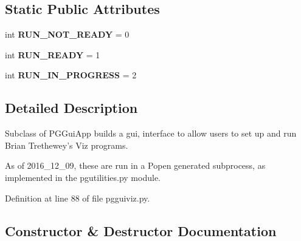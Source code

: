\subsection*{Static Public Attributes}
\begin{DoxyCompactItemize}
\item 
int {\bfseries R\+U\+N\+\_\+\+N\+O\+T\+\_\+\+R\+E\+A\+DY} = 0\hypertarget{classnegui_1_1pgguiviz_1_1PGGuiViz_a1199bb647ec58223ccbbeee7882e59dc}{}\label{classnegui_1_1pgguiviz_1_1PGGuiViz_a1199bb647ec58223ccbbeee7882e59dc}

\item 
int {\bfseries R\+U\+N\+\_\+\+R\+E\+A\+DY} = 1\hypertarget{classnegui_1_1pgguiviz_1_1PGGuiViz_a61b766c446b022b66ac5190a970a39ef}{}\label{classnegui_1_1pgguiviz_1_1PGGuiViz_a61b766c446b022b66ac5190a970a39ef}

\item 
int {\bfseries R\+U\+N\+\_\+\+I\+N\+\_\+\+P\+R\+O\+G\+R\+E\+SS} = 2\hypertarget{classnegui_1_1pgguiviz_1_1PGGuiViz_a18dc085b2121014d459c6cc51b9a06e4}{}\label{classnegui_1_1pgguiviz_1_1PGGuiViz_a18dc085b2121014d459c6cc51b9a06e4}

\end{DoxyCompactItemize}


\subsection{Detailed Description}
\begin{DoxyVerb}Subclass of PGGuiApp builds a gui,
interface to allow users to set up
and run Brian Trethewey's Viz programs.

As of 2016_12_09, these are run in a 
Popen generated subprocess, as implemented
in the pgutilities.py module.
\end{DoxyVerb}
 

Definition at line 88 of file pgguiviz.\+py.



\subsection{Constructor \& Destructor Documentation}
